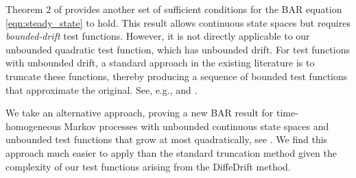 Theorem 2 of \cite{Glynn2008} provides another set of sufficient conditions for the BAR equation \eqref{eqn:steady_state} to hold. This result allows continuous state spaces but requires \emph{bounded-drift} test functions. However, it is not directly applicable to our unbounded quadratic test function, which has unbounded drift. 
For test functions with unbounded drift, a standard approach in the existing literature is to truncate these functions, thereby producing a sequence of bounded test functions that approximate the original. See, e.g., \cite{Braverman2017} and \cite{Guang2024}. 

We take an alternative approach, proving a new BAR result for time-homogeneous Markov processes with unbounded continuous state spaces and unbounded test functions that grow at most quadratically, see . We find this approach much easier to apply than the standard truncation method given the complexity of our test functions arising from the DiffeDrift method.